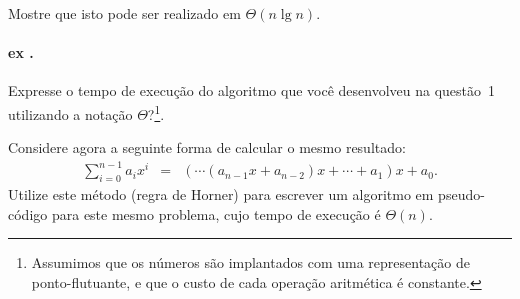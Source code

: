 \documentclass[a4wide]{article}
\newcounter{ExCounter}
\newcommand{\exercicio}[0]{%
\stepcounter{ExCounter}
\paragraph{ex \theExCounter.}
}
\begin{document}
Mostre que isto pode ser realizado em $\Theta(n \lg n)$.

\exercicio

Expresse o tempo de execução do algoritmo que você desenvolveu na
questão~1 utilizando a notação
$\Theta$?\footnote{Assumimos que os números são implantados com uma
  representação de ponto-flutuante, e que o custo de cada operação
  aritmética é constante.}.

Considere agora a seguinte forma de calcular o mesmo resultado:
\begin{eqnarray*}
\sum_{i=0}^{n-1} a_i x^i & = & (\cdots(a_{n-1}x + a_{n-2})x + \cdots + a_1)x + a_0.
\end{eqnarray*}
Utilize este método (regra de Horner) para escrever um algoritmo em
pseudo-código para este mesmo problema, cujo tempo de execução é
$\Theta(n)$.
\end{document}
